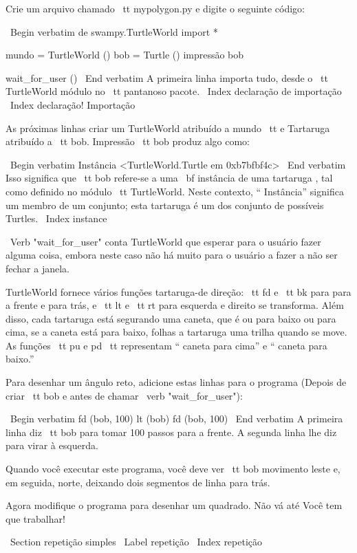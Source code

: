 \documentclass[10pt]{book}
\begin{document}
\begin {itemize}
{Crie um arquivo chamado {\ tt mypolygon.py} e digite o seguinte
código:

\ Begin {verbatim}
de swampy.TurtleWorld import *

mundo = TurtleWorld ()
bob = Turtle ()
impressão bob

wait_for_user ()
\ End {verbatim}
%
A primeira linha importa tudo, desde o {\ tt TurtleWorld} módulo
no {\ tt pantanoso} pacote.
\ Index {declaração de importação}
\ Index {declaração! Importação}

As próximas linhas criar um TurtleWorld atribuído a {mundo \ tt} e
Tartaruga atribuído a {\ tt bob}. Impressão {\ tt bob} produz algo
como:

\ Begin {verbatim}
Instância <TurtleWorld.Turtle em 0xb7bfbf4c>
\ End {verbatim}
%
Isso significa que {\ tt bob} refere-se a
uma {\ bf instância} de uma tartaruga
, tal como definido no módulo {\ tt TurtleWorld}. Neste contexto,
`` Instância'' significa um membro de um conjunto;
esta tartaruga é um dos conjunto de possíveis Turtles.
\ Index {instance}

\ Verb "wait_for_user" conta TurtleWorld que esperar para o usuário
fazer alguma coisa, embora neste caso não há muito para
o usuário a fazer a não ser fechar a janela.

TurtleWorld fornece vários
funções tartaruga-de direção: {\ tt fd} e {\ tt bk} para
para a frente e para trás, e {\ tt lt} e {\ tt rt} para esquerda e
direito se transforma. Além disso, cada tartaruga está segurando uma caneta, que é
ou para baixo ou para cima, se a caneta está para baixo, folhas a tartaruga
uma trilha quando se move. As funções {\ tt pu} e {pd \ tt}
representam `` caneta para cima'' e `` caneta para baixo.''

Para desenhar um ângulo reto, adicione estas linhas para o programa
(Depois de criar {\ tt bob} e antes de chamar \ verb "wait_for_user"):

\ Begin {verbatim}
fd (bob, 100)
lt (bob)
fd (bob, 100)
\ End {verbatim}
%
A primeira linha diz {\ tt bob} para tomar 100 passos
para a frente. A segunda linha lhe diz para virar à esquerda.

Quando você executar este programa, você deve ver {\ tt bob} movimento leste e, em seguida,
norte, deixando dois segmentos de linha para trás.

Agora modifique o programa para desenhar um quadrado. Não vá até
Você tem que trabalhar!


\ Section {repetição simples}
\ Label {repetição}
\ Index {repetição}

}
\end{itemize}
\end{document}
